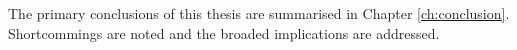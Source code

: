 The primary conclusions of this thesis are summarised in Chapter
\ref{ch:conclusion}.  Shortcommings are noted and the broaded implications
are addressed.




